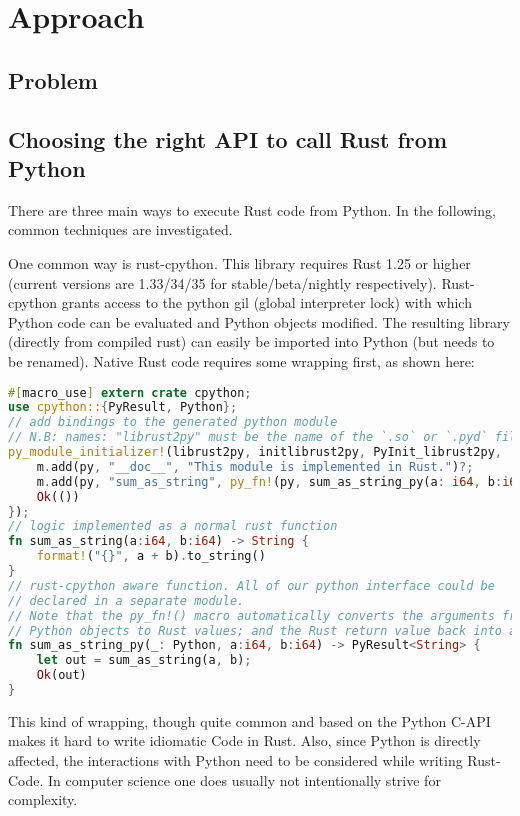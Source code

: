 \chapter{Approach}\label{chap:approach}


\section{Problem}\label{sec:problem}






\section{Choosing the right API to call Rust from Python}\label{sec:api}


There are three main ways to execute Rust code from Python. In the following, common techniques are investigated.

One common way is rust-cpython. This library requires Rust 1.25 or higher (current versions are 1.33/34/35 for stable/beta/nightly respectively). Rust-cpython grants access to the python gil (global interpreter lock) with which Python code can be evaluated and Python objects modified. The resulting library (directly from compiled rust) can easily be imported into Python (but needs to be renamed). Native Rust code requires some wrapping first, as shown here:
\begin{lstlisting}[language=Rust]
#[macro_use] extern crate cpython;
use cpython::{PyResult, Python};
// add bindings to the generated python module
// N.B: names: "librust2py" must be the name of the `.so` or `.pyd` file
py_module_initializer!(librust2py, initlibrust2py, PyInit_librust2py, |py, m| {
    m.add(py, "__doc__", "This module is implemented in Rust.")?;
    m.add(py, "sum_as_string", py_fn!(py, sum_as_string_py(a: i64, b:i64)))?;
    Ok(())
});
// logic implemented as a normal rust function
fn sum_as_string(a:i64, b:i64) -> String {
    format!("{}", a + b).to_string()
}
// rust-cpython aware function. All of our python interface could be
// declared in a separate module.
// Note that the py_fn!() macro automatically converts the arguments from
// Python objects to Rust values; and the Rust return value back into a Python object.
fn sum_as_string_py(_: Python, a:i64, b:i64) -> PyResult<String> {
    let out = sum_as_string(a, b);
    Ok(out)
}
\end{lstlisting}
This kind of wrapping, though quite common and based on the Python C-API makes it hard to write idiomatic Code in Rust. Also, since Python is directly affected, the interactions with Python need to be considered while writing Rust-Code. In computer science one does usually not intentionally strive for complexity.

